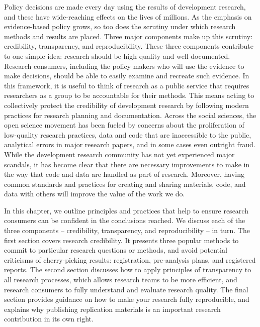 
\begin{fullwidth}

Policy decisions are made every day using the results of development research,
and these have wide-reaching effects on the lives of millions.
As the emphasis on evidence-based policy grows,
so too does the scrutiny under which research methods and results are placed.
Three major components make up this scrutiny:
credibility, transparency, and reproducibility.
These three components contribute to one simple idea:
research should be high quality and well-documented.
Research consumers, including the policy makers who will use the evidence to make decisions,
should be able to easily examine and recreate such evidence.
In this framework, it is useful to think of research as a public service
that requires researchers as a group to be accountable for their methods.
This means acting to collectively protect the credibility of development research
by following modern practices for research planning and documentation.
Across the social sciences, the open science movement has been fueled
by concerns about the proliferation of low-quality research practices,
data and code that are inaccessible to the public,
analytical errors in major research papers,
and in some cases even outright fraud.
While the development research community has not yet
experienced major scandals,
it has become clear that there are necessary improvements to make
in the way that code and data are handled as part of research.
Moreover, having common standards and practices
for creating and sharing materials, code, and data with others
will improve the value of the work we do.

In this chapter, we outline principles and practices that help to ensure
research consumers can be confident in the conclusions reached.
We discuss each of the three components --
credibility, transparency, and reproducibility -- in turn.
The first section covers research credibility.
It presents three popular methods to commit to particular research questions or methods,
and avoid potential criticisms of cherry-picking results:
registration, pre-analysis plans, and registered reports.
The second section discusses how to apply principles of transparency to all research processes,
which allows research teams to be more efficient, and
research consumers to fully understand and evaluate research quality.
The final section provides guidance on how to make your research fully reproducible,
and explains why publishing replication materials is an important research contribution in its own right.

\end{fullwidth}


